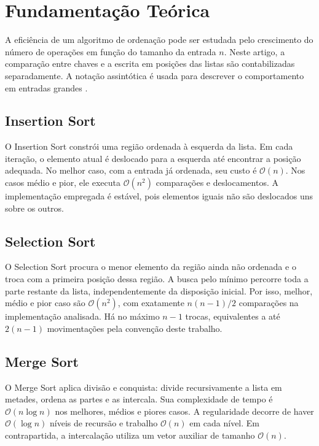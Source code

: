 \documentclass[12pt]{article}
\begin{document}
\section{Fundamentação Teórica}

A eficiência de um algoritmo de ordenação pode ser estudada pelo crescimento do
número de operações em função do tamanho da entrada $n$. Neste artigo, a
comparação entre chaves e a escrita em posições das listas são contabilizadas
separadamente. A notação assintótica é usada para descrever o comportamento em
entradas grandes \cite{cormen,ziviani}.

\subsection{Insertion Sort}

O Insertion Sort constrói uma região ordenada à esquerda da lista. Em cada
iteração, o elemento atual é deslocado para a esquerda até encontrar a posição
adequada. No melhor caso, com a entrada já ordenada, seu custo é
$\mathcal{O}(n)$. Nos casos médio e pior, ele executa
$\mathcal{O}(n^2)$ comparações e deslocamentos. A implementação empregada é
estável, pois elementos iguais não são deslocados uns sobre os outros.

\subsection{Selection Sort}

O Selection Sort procura o menor elemento da região ainda não ordenada e o
troca com a primeira posição dessa região. A busca pelo mínimo percorre toda a
parte restante da lista, independentemente da disposição inicial. Por isso,
melhor, médio e pior caso são $\mathcal{O}(n^2)$, com exatamente
$n(n-1)/2$ comparações na implementação analisada. Há no máximo $n-1$ trocas,
equivalentes a até $2(n-1)$ movimentações pela convenção deste trabalho.

\subsection{Merge Sort}

O Merge Sort aplica divisão e conquista: divide recursivamente a lista em
metades, ordena as partes e as intercala. Sua complexidade de tempo é
$\mathcal{O}(n\log n)$ nos melhores, médios e piores casos. A regularidade
decorre de haver $\mathcal{O}(\log n)$ níveis de recursão e trabalho
$\mathcal{O}(n)$ em cada nível. Em contrapartida, a intercalação utiliza um
vetor auxiliar de tamanho $\mathcal{O}(n)$.
\end{document}
